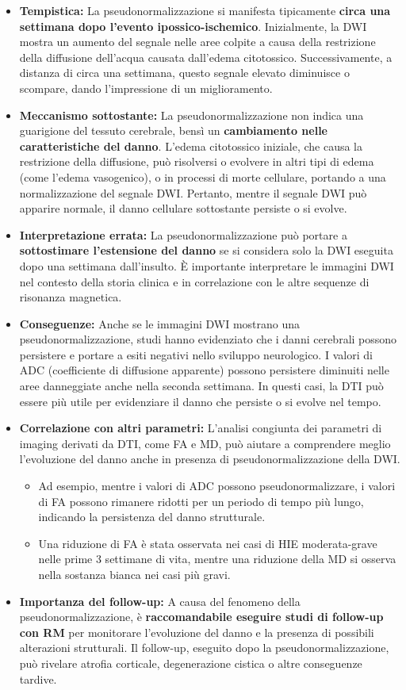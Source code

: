\begin{itemize}
	\tightlist
	\item
	\textbf{Tempistica:} La pseudonormalizzazione si manifesta tipicamente \textbf{circa una settimana dopo l'evento ipossico-ischemico}. Inizialmente, la DWI mostra un aumento del segnale nelle aree colpite a causa della restrizione della diffusione dell'acqua causata dall'edema citotossico. Successivamente, a distanza di circa una settimana, questo segnale elevato diminuisce o scompare, dando l'impressione di un miglioramento.
	\item
	\textbf{Meccanismo sottostante:} La pseudonormalizzazione non indica una guarigione del tessuto cerebrale, bensì un \textbf{cambiamento nelle caratteristiche del danno}. L'edema citotossico iniziale, che causa la restrizione della diffusione, può risolversi o evolvere in altri tipi di edema (come l'edema vasogenico), o in processi di morte cellulare, portando a una normalizzazione del segnale DWI. Pertanto, mentre il segnale DWI può apparire normale, il danno cellulare sottostante persiste o si evolve.
	\item
	\textbf{Interpretazione errata:} La pseudonormalizzazione può portare a \textbf{sottostimare l'estensione del danno} se si considera solo la DWI eseguita dopo una settimana dall'insulto. È importante interpretare le immagini DWI nel contesto della storia clinica e in correlazione con le altre sequenze di risonanza magnetica.
	\item
	\textbf{Conseguenze:} Anche se le immagini DWI mostrano una pseudonormalizzazione, studi hanno evidenziato che i danni cerebrali possono persistere e portare a esiti negativi nello sviluppo neurologico. I valori di ADC (coefficiente di diffusione apparente) possono persistere diminuiti nelle aree danneggiate anche nella seconda settimana. In questi casi, la DTI può essere più utile per evidenziare il danno che persiste o si evolve nel tempo.
	\item
	\textbf{Correlazione con altri parametri:} L'analisi congiunta dei parametri di imaging derivati da DTI, come FA e MD, può aiutare a comprendere meglio l'evoluzione del danno anche in presenza di pseudonormalizzazione della DWI.
	
	\begin{itemize}
		\tightlist
		\item
		Ad esempio, mentre i valori di ADC possono pseudonormalizzare, i valori di FA possono rimanere ridotti per un periodo di tempo più lungo, indicando la persistenza del danno strutturale.
		\item
		Una riduzione di FA è stata osservata nei casi di HIE moderata-grave nelle prime 3 settimane di vita, mentre una riduzione della MD si osserva nella sostanza bianca nei casi più gravi.
	\end{itemize}
	\item
	\textbf{Importanza del follow-up:} A causa del fenomeno della pseudonormalizzazione, è \textbf{raccomandabile eseguire studi di follow-up con RM} per monitorare l'evoluzione del danno e la presenza di possibili alterazioni strutturali. Il follow-up, eseguito dopo la pseudonormalizzazione, può rivelare atrofia corticale, degenerazione cistica o altre conseguenze tardive.
\end{itemize}
